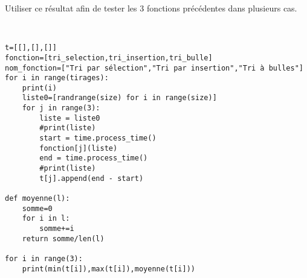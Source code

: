 \begin{exercice}
Utiliser ce résultat afin de tester les 3 fonctions précédentes dans plusieurs cas.
\end{exercice}        

\begin{solution}~\\
\vspace{-0.7cm}
\begin{verbatim}
t=[[],[],[]]
fonction=[tri_selection,tri_insertion,tri_bulle]
nom_fonction=["Tri par sélection","Tri par insertion","Tri à bulles"]
for i in range(tirages):
    print(i)
    liste0=[randrange(size) for i in range(size)]
    for j in range(3):
        liste = liste0
        #print(liste)
        start = time.process_time()
        fonction[j](liste) 
        end = time.process_time()
        #print(liste)
        t[j].append(end - start)
        
def moyenne(l):
    somme=0
    for i in l:
        somme+=i
    return somme/len(l)

for i in range(3):
    print(min(t[i]),max(t[i]),moyenne(t[i]))
\end{verbatim}    
\end{solution}





















